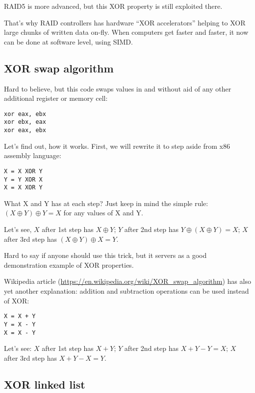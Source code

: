 \ac{RAID}5 is more advanced, but this XOR property is still exploited there.

That's why \ac{RAID} controllers has hardware ``XOR accelerators'' helping to XOR large chunks of written data on-fly.
When computers get faster and faster, it now can be done at software level, using \ac{SIMD}.

\subsection{XOR swap algorithm}

Hard to believe, but this code swaps values in \EAX and \EBX without aid of any other additional register or memory cell:

\begin{lstlisting}[style=customasmx86]
xor eax, ebx
xor ebx, eax
xor eax, ebx
\end{lstlisting}

Let's find out, how it works.
First, we will rewrite it to step aside from x86 assembly language:

\begin{lstlisting}
X = X XOR Y
Y = Y XOR X
X = X XOR Y
\end{lstlisting}

What X and Y has at each step?
Just keep in mind the simple rule: $(X \oplus Y) \oplus Y = X$ for any values of X and Y.

Let's see,
$X$ after 1st step has $X \oplus Y$;
$Y$ after 2nd step has $Y \oplus (X \oplus Y) = X$;
$X$ after 3rd step has $(X \oplus Y) \oplus X = Y$.

Hard to say if anyone should use this trick, but it servers as a good demonstration example of XOR properties.

Wikipedia article (\url{https://en.wikipedia.org/wiki/XOR_swap_algorithm}) has also yet another explanation:
addition and subtraction operations can be used instead of XOR:

\begin{lstlisting}
X = X + Y
Y = X - Y
X = X - Y
\end{lstlisting}

Let's see:
$X$ after 1st step has $X+Y$;
$Y$ after 2nd step has $X+Y-Y=X$;
$X$ after 3rd step has $X+Y-X=Y$.

\subsection{XOR linked list}

